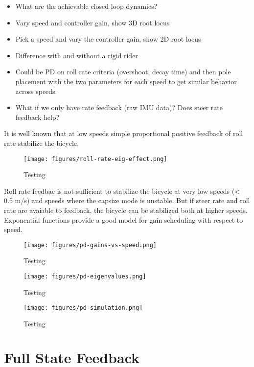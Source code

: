\documentclass[12pt]{article}
\begin{document}
\begin{itemize}
  \item What are the achievable closed loop dynamics?
  \item Vary speed and controller gain, show 3D root locus
  \item Pick a speed and vary the controller gain, show 2D root locus
  \item Difference with and without a rigid rider
  \item Could be PD on roll rate criteria (overshoot, decay time) and then pole
    placement with the two parameters for each speed to get similar behavior
    across speeds.
  \item What if we only have rate feedback (raw IMU data)? Does steer rate
    feedback help?
\end{itemize}

It is well known that at low speeds simple proportional positive feedback of
roll rate stabilize the bicycle.

\begin{figure}
  \centering
  \texttt{[image: figures/roll-rate-eig-effect.png]}
  \caption{Testing}
  \label{fig:roll-rate-eig-effect}
\end{figure}

Roll rate feedbac is not sufficient to stabilize the bicycle at very low speeds
(< 0.5 m/s) and speeds where the capsize mode is unstable. But if steer rate
and roll rate are avaiable to feedback, the bicycle can be stabilized both at
higher speeds. Exponential functions provide a good model for gain scheduling
with respect to speed.

\begin{figure}
  \centering
  \texttt{[image: figures/pd-gains-vs-speed.png]}
  \caption{Testing}
  \label{fig:pd-gains-vs-speed}
\end{figure}

\begin{figure}
  \centering
  \texttt{[image: figures/pd-eigenvalues.png]}
  \caption{Testing}
  \label{fig:pd-eigenvalues}
\end{figure}

\begin{figure}
  \centering
  \texttt{[image: figures/pd-simulation.png]}
  \caption{Testing}
  \label{fig:pd_simulation}
\end{figure}

\section{Full State Feedback}
\end{document}
